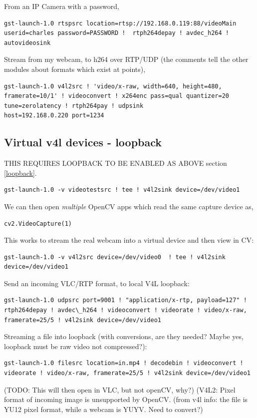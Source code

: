 \documentclass[oneside,english]{scrbook}
\begin{document}
From an IP Camera with a password,
\begin{lstlisting}
gst-launch-1.0 rtspsrc location=rtsp://192.168.0.119:88/videoMain userid=charles password=PASSWORD !  rtph264depay ! avdec_h264 ! autovideosink
\end{lstlisting}

Stream from my webcam, to h264 over RTP/UDP (the comments tell the other modules about formats which exist at points),
\begin{lstlisting}
gst-launch-1.0 v4l2src ! 'video/x-raw, width=640, height=480, framerate=10/1' ! videoconvert ! x264enc pass=qual quantizer=20 tune=zerolatency ! rtph264pay ! udpsink
host=192.168.0.220 port=1234
\end{lstlisting}


\subsection{Virtual v4l devices - loopback}

THIS REQUIRES LOOPBACK TO BE ENABLED AS ABOVE section \ref{loopback}.

\begin{lstlisting}
gst-launch-1.0 -v videotestsrc ! tee ! v4l2sink device=/dev/video1 
\end{lstlisting}

We can then open {\em multiple} OpenCV apps which read the same capture device as,
\begin{lstlisting}
cv2.VideoCapture(1)
\end{lstlisting}

This works to stream the real webcam into a virtual device and then view in CV:
\begin{lstlisting}
gst-launch-1.0 -v v4l2src device=/dev/video0  ! tee ! v4l2sink device=/dev/video1
\end{lstlisting}

Send an incoming VLC/RTP format, to local V4L loopback: 
\begin{lstlisting}
gst-launch-1.0 udpsrc port=9001 ! "application/x-rtp, payload=127" ! rtph264depay ! avdec\_h264 ! videoconvert ! videorate ! video/x-raw, framerate=25/5 ! v4l2sink device=/dev/video1
\end{lstlisting}

Streaming a file into loopback (with conversions, are they needed? Maybe yes, loopback must be raw video not compressed?):
\begin{lstlisting}
gst-launch-1.0 filesrc location=in.mp4 ! decodebin ! videoconvert ! videorate ! video/x-raw, framerate=25/5 ! v4l2sink device=/dev/video1
\end{lstlisting}
(TODO: This will then open in VLC, but not openCV, why?)
(V4L2: Pixel format of incoming image is unsupported by OpenCV.
(from v4l info: the file is YU12 pixel format, while a webcam is YUYV. Need to convert?)
\end{document}
